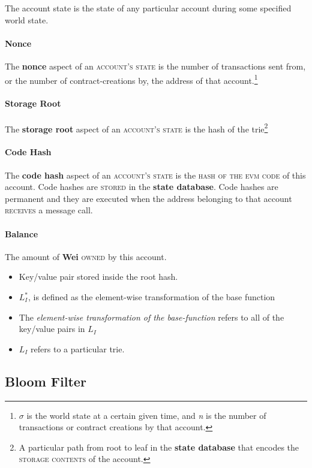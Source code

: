 \documentclass[10pt,a4paper,leqno,bibliography=totoc]{scrartcl}
\newenvironment{alphafootnotes}
{\par\edef\savedfootnotenumber{\number\value{footnote}}
\renewcommand{\thefootnote}{\alph{footnote}}
\setcounter{footnote}{0}}
{\par\setcounter{footnote}{\savedfootnotenumber}}
\begin{document}
\begin{alphafootnotes}
\begin{multicols*}{2}
				The account state is the state of any particular account during some specified world state.

    				\paragraph{Nonce} 
					The \textbf{nonce} aspect of an \textsc{account's state} is the number of transactions sent from, or the number of contract-creations by, the address of that account.\footnote{$\sigma$ is the world state at a certain given time, and \textit{n} is the number of transactions or contract creations by that account.}
    				\paragraph{Storage Root}
    					The \textbf{storage root} aspect of an \textsc{account's state} is the hash of the trie\footnote{A particular path from root to leaf in the \textbf{\gls{state database}} that encodes the \textsc{storage contents} of the account.}
    				\paragraph{Code Hash}
    					The \textbf{code hash} aspect of an \textsc{account's state} is the \textsc{hash of the evm code} of this account. Code hashes are \textsc{stored} in the \textbf{\gls{state database}}. Code hashes are permanent and they are executed when the address belonging to that account \textsc{receives} a message call.
    				\paragraph{Balance}
    					The amount of \textbf{Wei} \textsc{owned} by this account. 
					    \begin{itemize}
				            \item Key/value pair stored inside the root hash. 
					    \item $L_I^*$, is defined as the element-wise transformation of the base function
					    \item The \textsl{element-wise transformation of the base-function} refers to all of the key/value pairs in \textit{$L_I$}
					    \item $L_I$ refers to a particular \gls{trie}.
					    \end{itemize}

   		\subsection{Bloom Filter}

\end{multicols*}
\end{alphafootnotes}
\end{document}
